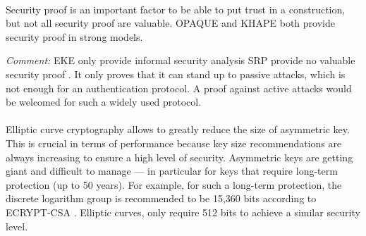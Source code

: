 ﻿\documentclass[../report.tex]{subfiles}
\begin{document}
\paragraph{}
Security proof is an important factor to be able to put trust in a construction, but not all security proof are valuable.
OPAQUE and KHAPE both provide security proof in strong models.

\emph{Comment:} EKE only provide informal security analysis \cite{EKE_Informal_Security_Analysis}
SRP provide no valuable security proof \cite{CAA, SRP_Green_blog}. It only proves that it can stand up to passive attacks, which is not enough for an authentication protocol. A proof against active attacks would be welcomed for such a widely used protocol.


\paragraph{}  \label{sec:ecc_comparison}
Elliptic curve cryptography allows to greatly reduce the size of asymmetric key.
This is crucial in terms of performance because key size recommendations are always increasing to ensure a high level of security. Asymmetric keys are getting giant and difficult to manage --- in particular for keys that require long-term protection (up to 50 years). For example, for such a long-term protection, the discrete logarithm group is recommended to be 15,360 bits according to ECRYPT-CSA \cite{ECRYPT_Keylength}.
Elliptic curves, only require 512 bits to achieve a similar security level.
\end{document}
